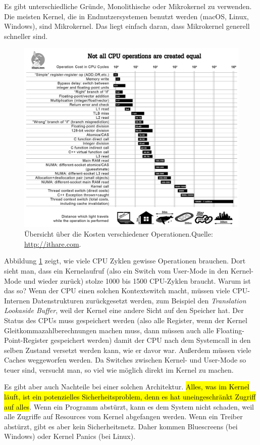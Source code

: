 \documentclass[ngerman,abstract=true]{scrartcl}
\begin{document}
Es gibt unterschiedliche Gründe, Monolithische oder Mikrokernel zu verwenden. Die meisten Kernel, die in Endnutzersystemen benutzt werden (macOS, Linux, Windows), sind Mikrokernel. Das liegt einfach daran, dass Mikrokernel generell schneller sind.
\begin{figure}[p]
\includegraphics[width=\textwidth]{media/infographic}
\caption{Übersicht über die Kosten verschiedener Operationen.\newline Quelle: \url{http://ithare.com}.}\label{fig:infographic}  
\end{figure}
Abbildung \ref{fig:infographic} zeigt, wie viele CPU Zyklen gewisse Operationen brauchen. Dort sieht man, dass ein Kernelaufruf (also ein Switch vom User-Mode in den Kernel-Mode und wieder zurück) stolze 1000 bis 1500 CPU-Zyklen braucht. Warum ist das so? Wenn der CPU einen solchen Kontextswitch macht, müssen viele CPU-Internen Datenstrukturen zurückgesetzt werden, zum Beispiel den \emph{Translation Lookaside Buffer}, weil der Kernel eine andere Sicht auf den Speicher hat. Der Status des CPUs muss gespeichert werden (also alle Register, wenn der Kernel Gleitkommazahlberechnungen machen muss, dann müssen auch alle Floating-Point-Register gespeichert werden) damit der CPU nach dem Systemcall in den selben Zustand versetzt werden kann, wie er davor war. Außerdem müssen viele Caches weggeworfen werden. Da Switches zwischen Kernel- und User-Mode so teuer sind, versucht man, so viel wie möglich direkt im Kernel zu machen. 

Es gibt aber auch Nachteile bei einer solchen Architektur. \hl{Alles, was im Kernel läuft, ist ein potenzielles Sicherheitsproblem, denn es hat uneingeschränkt Zugriff auf alles}. Wenn ein Programm abstürzt, kann es dem System nicht schaden, weil alle Zugriffe auf Resources vom Kernel abgefangen werden. Wenn ein Treiber abstürzt, gibt es aber kein Sicherheitsnetz. Daher kommen Bluescreens (bei Windows) oder Kernel Panics (bei Linux).
\end{document}
